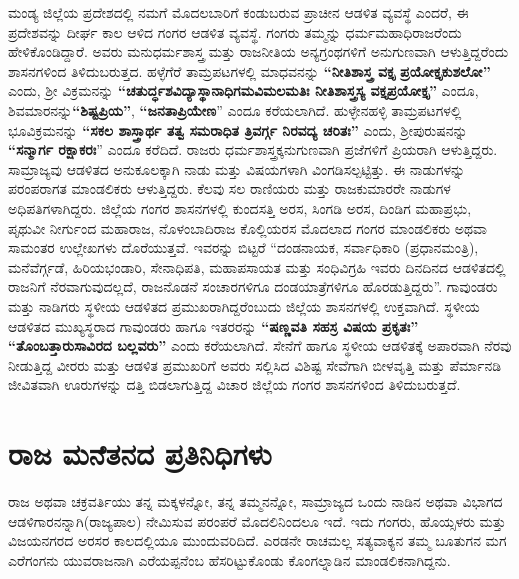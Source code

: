 ಮಂಡ್ಯ ಜಿಲ್ಲೆಯ ಪ್ರದೇಶದಲ್ಲಿ ನಮಗೆ ಮೊದಲಬಾರಿಗೆ ಕಂಡುಬರುವ ಪ್ರಾಚೀನ ಆಡಳಿತ ವ್ಯವಸ್ಥೆ ಎಂದರೆ, ಈ ಪ್ರದೇಶವನ್ನು ದೀರ್ಘ ಕಾಲ ಆಳಿದ ಗಂಗರ ಆಡಳಿತ ವ್ಯವಸ್ಥೆ. ಗಂಗರು ತಮ್ಮನ್ನು ಧರ್ಮಮಹಾಧಿರಾಜರೆಂದು ಹೇಳಿಕೊಂಡಿದ್ದಾರೆ. ಅವರು ಮನುಧರ್ಮಶಾಸ್ತ್ರ ಮತ್ತು ರಾಜನೀತಿಯ ಅನ್ಯಗ್ರಂಥಗಳಿಗೆ ಅನುಗುಣವಾಗಿ ಆಳುತ್ತಿದ್ದರೆಂದು ಶಾಸನಗಳಿಂದ ತಿಳಿದುಬರುತ್ತದ. ಹಳ್ಳೆಗೆರೆ ತಾಮ್ರಪಟಗಳಲ್ಲಿ ಮಾಧವನನ್ನು \textbf{“ನೀತಿಶಾಸ್ತ್ರ ವಕ್ತೃ ಪ್ರಯೋಕ್ತೃಕುಶಲೋ”} ಎಂದು, ಶ‍್ರೀ ವಿಕ್ರಮನನ್ನು \textbf{“ಚತುರ್ದ್ಧಶವಿದ್ಯಾಸ್ಥಾನಾಧಿಗಮವಿಮಲಮತಿಃ ನೀತಿಶಾಸ್ತ್ರಸ್ಯ ವಕ್ತೃಪ್ರಯೋಕ್ತೃ”} ಎಂದೂ, ಶಿವಮಾರನನ್ನು\break \textbf{“ಶಿಷ್ಟಪ್ರಿಯ”}, \textbf{“ಜನತಾಪ್ರಿಯೇಣ}” ಎಂದೂ ಕರೆಯಲಾಗಿದೆ. ಹುಳ್ಳೇನಹಳ್ಳಿ ತಾಮ್ರಪಟಗಳಲ್ಲಿ ಭೂವಿಕ್ರಮನನ್ನು \textbf{“ಸಕಲ ಶಾಸ್ತ್ರಾರ್ಥ ತತ್ವ ಸಮರಾಧಿತ ತ್ರಿವರ್ಗ್ಗ ನಿರವದ್ಯ ಚರಿತಃ”} ಎಂದು, ಶ‍್ರೀಪುರುಷನನ್ನು \textbf{“ಸನ್ಮಾರ್ಗ ರಕ್ಷಾಕರಃ}” ಎಂದೂ ಕರೆದಿದೆ. ರಾಜರು ಧರ್ಮಶಾಸ್ತ್ರಕ್ಕನುಗುಣವಾಗಿ ಪ್ರಜೆಗಳಿಗೆ ಪ್ರಿಯರಾಗಿ ಆಳುತ್ತಿದ್ದರು. ಸಾಮ್ರಾಜ್ಯವು ಆಡಳಿತದ ಅನುಕೂಲಕ್ಕಾಗಿ ನಾಡು ಮತ್ತು ವಿಷಯಗಳಾಗಿ ವಿಂಗಡಿಸಲ್ಪಟ್ಟಿತ್ತು. ಈ ನಾಡುಗಳನ್ನು ಪರಂಪರಾಗತ ಮಾಂಡಲಿಕರು ಆಳುತ್ತಿದ್ದರು. ಕೆಲವು ಸಲ ರಾಣಿಯರು ಮತ್ತು ರಾಜಕುಮಾರರೇ ನಾಡುಗಳ ಅಧಿಪತಿಗಳಾಗಿದ್ದರು. ಜಿಲ್ಲೆಯ ಗಂಗರ ಶಾಸನಗಳಲ್ಲಿ ಕುಂದಸತ್ತಿ ಅರಸ, ಸಿಂಗಡಿ ಅರಸ, ದಿಂಡಿಗ ಮಹಾಪ್ರಭು, ಪೃಥುವೀ ನೀರ್ಗುಂದ ಮಹಾರಾಜ, ನೊಳಂಬಾದಿರಾಜ ಕೊಲ್ಲಿಯರಸ ಮೊದಲಾದ ಗಂಗರ ಮಾಂಡಲಿಕರು ಅಥವಾ ಸಾಮಂತರ ಉಲ್ಲೇಖಗಳು ದೊರೆಯುತ್ತವೆ. ಇವರನ್ನು ಬಿಟ್ಟರೆ “ದಂಡನಾಯಕ, ಸರ್ವಾಧಿಕಾರಿ (ಪ್ರಧಾನಮಂತ್ರಿ), ಮನೆವೆರ್ಗ್ಗಡೆ, ಹಿರಿಯಭಂಡಾರಿ, ಸೇನಾಧಿಪತಿ, ಮಹಾಪಸಾಯತ ಮತ್ತು ಸಂಧಿವಿಗ್ರಹಿ ಇವರು ದಿನದಿನದ ಆಡಳಿತದಲ್ಲಿ ರಾಜನಿಗೆ ನೆರವಾಗುವುದಲ್ಲದೆ, ರಾಜನೊಡನೆ ಸಂಚಾರಗಳಿಗೂ ದಂಡಯಾತ್ರೆಗಳಿಗೂ ಹೊರಡುತ್ತಿದ್ದರು''. ಗಾವುಂಡರು ಮತ್ತು ನಾಡಿಗರು ಸ್ಥಳೀಯ ಆಡಳಿತದ ಪ್ರಮುಖರಾಗಿದ್ದರೆಂಬುದು ಜಿಲ್ಲೆಯ ಶಾಸನಗಳಲ್ಲಿ ಉಕ್ತವಾಗಿದೆ. ಸ್ಥಳೀಯ ಆಡಳಿತದ ಮುಖ್ಯಸ್ಥರಾದ ಗಾವುಂಡರು ಹಾಗೂ ಇತರರನ್ನು \textbf{“ಷಣ್ಣವತಿ ಸಹಸ್ರ ವಿಷಯ ಪ್ರಕೃತಃ” “ತೊಂಬತ್ತಾರುಸಾವಿರದ ಬಲ್ಲವರು”} ಎಂದು ಕರೆಯಲಾಗಿದೆ. ಸೇನೆಗೆ ಹಾಗೂ ಸ್ಥಳೀಯ ಆಡಳಿತಕ್ಕೆ ಅಪಾರವಾಗಿ ನೆರವು ನೀಡುತ್ತಿದ್ದ ವೀರರು ಮತ್ತು ಆಡಳಿತ ಪ್ರಮುಖರಿಗೆ ಅವರು ಸಲ್ಲಿಸಿದ ವಿಶಿಷ್ಟ ಸೇವೆಗಾಗಿ ಬೀಳವೃತ್ತಿ ಮತ್ತು ಪೆರ್ಮಾನಡಿ ಜೀವಿತವಾಗಿ ಊರುಗಳನ್ನು ದತ್ತಿ ಬಿಡಲಾಗುತ್ತಿದ್ದ ವಿಚಾರ ಜಿಲ್ಲೆಯ ಗಂಗರ ಶಾಸನಗಳಿಂದ ತಿಳಿದುಬರುತ್ತದೆ.


\section{ರಾಜ ಮನೆತನದ ಪ್ರತಿನಿಧಿಗಳು}

ರಾಜ ಅಥವಾ ಚಕ್ರವರ್ತಿಯು ತನ್ನ ಮಕ್ಕಳನ್ನೋ, ತನ್ನ ತಮ್ಮನನ್ನೋ, ಸಾಮ್ರಾಜ್ಯದ ಒಂದು ನಾಡಿನ ಅಥವಾ ವಿಭಾಗದ ಆಡಳಿಗಾರನನ್ನಾಗಿ(ರಾಜ್ಯಪಾಲ) ನೇಮಿಸುವ ಪರಂಪರೆ ಮೊದಲಿನಿಂದಲೂ ಇದೆ. ಇದು ಗಂಗರು, ಹೊಯ್ಸಳರು ಮತ್ತು ವಿಜಯನಗರದ ಅರಸರ ಕಾಲದಲ್ಲಿಯೂ ಮುಂದುವರಿದಿದೆ. ಎರಡನೇ ರಾಚಮಲ್ಲ ಸತ್ಯವಾಕ್ಯನ ತಮ್ಮ ಬೂತುಗನ ಮಗ ಎರೆಗಂಗನು ಯುವರಾಜನಾಗಿ ಎರೆಯಪ್ಪನೆಂಬ ಹೆಸರಿಟ್ಟುಕೊಂಡು ಕೊಂಗಲ್ನಾಡಿನ ಮಾಂಡಲಿಕನಾಗಿದ್ದನು.

